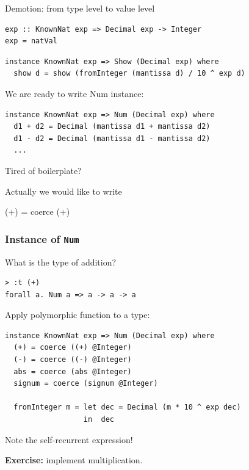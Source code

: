 \documentclass[handout]{beamer}
\begin{document}
\begin{frame}[fragile]{Demotion: from type level to value level}

\begin{lstlisting}
exp :: KnownNat exp => Decimal exp -> Integer
exp = natVal
\end{lstlisting}

\begin{lstlisting}
instance KnownNat exp => Show (Decimal exp) where
  show d = show (fromInteger (mantissa d) / 10 ^ exp d)
\end{lstlisting}

We are ready to write Num instance:

\begin{lstlisting}
instance KnownNat exp => Num (Decimal exp) where
  d1 + d2 = Decimal (mantissa d1 + mantissa d2)
  d1 - d2 = Decimal (mantissa d1 - mantissa d2)
  ...
\end{lstlisting}

\centerline{Tired of boilerplate?}

\bigskip

\centerline{Actually we would like to write}

\centerline{(+) = coerce (+)}

\end{frame}

\begin{frame}[fragile=singleslide]\frametitle{Instance of {\tt Num}}

What is the type of addition?

\begin{lstlisting}
> :t (+)
forall a. Num a => a -> a -> a
\end{lstlisting}

Apply polymorphic function to a type:

\begin{lstlisting}
instance KnownNat exp => Num (Decimal exp) where
  (+) = coerce ((+) @Integer)
  (-) = coerce ((-) @Integer)
  abs = coerce (abs @Integer)
  signum = coerce (signum @Integer)

  fromInteger m = let dec = Decimal (m * 10 ^ exp dec)
                  in  dec
\end{lstlisting}

\centerline{Note the self-recurrent expression!}

\bigskip

{\bf Exercise:} implement multiplication.

\end{frame}
\end{document}
